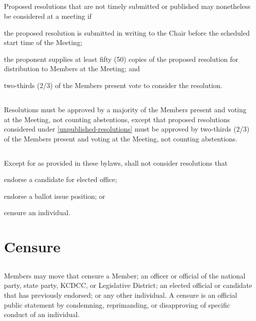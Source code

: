 \subsection{} \label{unpublished-resolutions}
Proposed resolutions that are not timely submitted or published may nonetheless be considered at a meeting if
\begin{inlinealphalist}
    \item the proposed resolution is submitted in writing to the Chair before the scheduled start time of the Meeting;
    \item the proponent supplies at least fifty (50) copies of the proposed resolution for distribution to Members at the Meeting; and
    \item two-thirds (2/3) of the Members present vote to consider the resolution.
\end{inlinealphalist}

\subsection{}
Resolutions must be approved by a majority of the Members present and voting at the Meeting, not counting abstentions, except that proposed resolutions considered under \autoref{unpublished-resolutions} must be approved by two-thirds (2/3) of the Members present and voting at the Meeting, not counting abstentions.

\subsection{}
Except for as provided in these bylaws, \thedistrict{} shall not consider resolutions that
\begin{inlinealphalist}
    \item endorse a candidate for elected office;
    \item endorse a ballot issue position; or
    \item censure an individual.
\end{inlinealphalist}

\section{Censure}
\subsection{}
Members may move that \thedistrict{} censure a Member; an officer or official of the national party, state party, KCDCC, or \fortythird{} Legislative District; an elected official or candidate that \thedistrict{} has previously endorsed; or any other individual. A censure is an official public statement by \thedistrict{} condemning, reprimanding, or disapproving of specific conduct of an individual.

